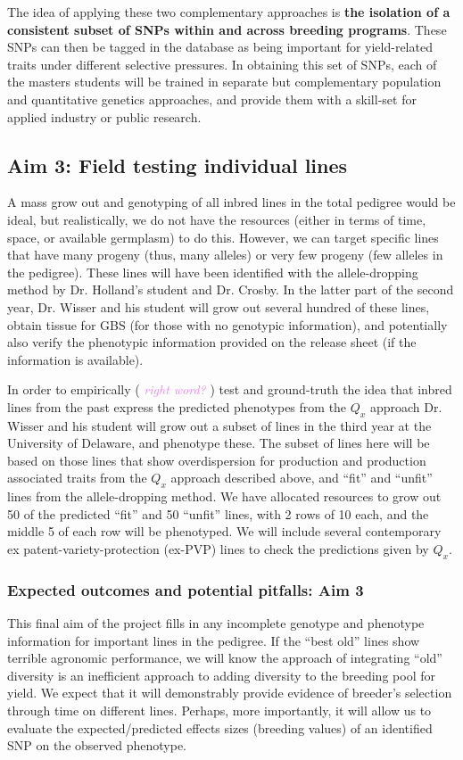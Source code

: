 \documentclass[12pt]{article}
\newcommand{\kc}[1]{\textcolor{violet}{ \emph{\scriptsize  #1}} }
\begin{document}
The idea of applying these two complementary approaches is \textbf{the isolation of a consistent subset of SNPs within and across breeding programs}. 
These SNPs can then be tagged in the database as being important for yield-related traits under different selective pressures.
In obtaining this set of SNPs, each of the masters students will be trained in separate but complementary population and quantitative genetics approaches, and provide them with a skill-set for applied industry or public research. 


\subsection*{Aim 3: Field testing individual lines}
A mass grow out and genotyping of all inbred lines in the total pedigree would be ideal, but realistically, we do not have the resources (either in terms of time, space, or available germplasm) to do this.
However, we can target specific lines that have many progeny (thus, many alleles) or very few progeny (few alleles in the pedigree). These lines will have been identified with the allele-dropping method by Dr. Holland's student and Dr. Crosby. 
In the latter part of the second year, Dr. Wisser and his student will grow out several hundred of these lines, obtain tissue for GBS (for those with no genotypic information), and potentially also verify the phenotypic information provided on the release sheet (if the information is available). 

In order to empirically (\kc{right word?}) test and ground-truth the idea that inbred lines from the past express the predicted phenotypes from the $Q_{x}$ approach Dr. Wisser and his student will grow out a subset of lines in the third year at the University of Delaware, and phenotype these.
The subset of lines here will be based on those lines that show overdispersion for production and production associated traits from the $Q_{x}$ approach described above, and ``fit'' and ``unfit'' lines from the allele-dropping method. 
We have allocated resources to grow out 50 of the predicted ``fit'' and 50 ``unfit'' lines, with 2 rows of 10 each, and the middle 5 of each row will be phenotyped. 
We will include several contemporary ex patent-variety-protection (ex-PVP) lines to check the predictions given by $Q_{x}$.


\subsubsection*{Expected outcomes and potential pitfalls: Aim 3}
This final aim of the project fills in any incomplete genotype and phenotype information for important lines in the pedigree. If the ``best old'' lines show terrible agronomic performance, we will know the approach of integrating ``old'' diversity is an inefficient approach to adding diversity to the breeding pool for yield. 
We expect that it will demonstrably provide evidence of breeder's selection through time on different lines.
Perhaps, more importantly, it will allow us to evaluate the expected/predicted effects sizes (breeding values) of an identified SNP on the observed phenotype. 
\end{document}
